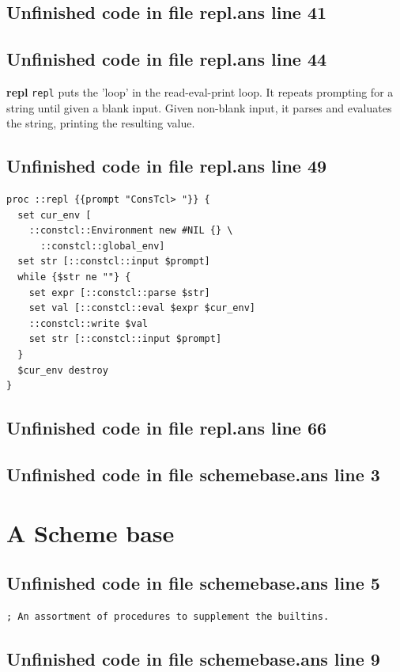 \documentclass[twoside,9pt]{report}
\begin{document}
\section{Unfinished code in file repl.ans line 41}

\section{Unfinished code in file repl.ans line 44}

\textbf{repl} \texttt{repl} puts the 'loop' in the read-eval-print loop. It repeats prompting for a string until given a blank input. Given non-blank input, it parses and evaluates the string, printing the resulting value.

\section{Unfinished code in file repl.ans line 49}
\begin{lstlisting}
proc ::repl {{prompt "ConsTcl> "}} {
  set cur_env [
    ::constcl::Environment new #NIL {} \
      ::constcl::global_env]
  set str [::constcl::input $prompt]
  while {$str ne ""} {
    set expr [::constcl::parse $str]
    set val [::constcl::eval $expr $cur_env]
    ::constcl::write $val
    set str [::constcl::input $prompt]
  }
  $cur_env destroy
}
\end{lstlisting}
\section{Unfinished code in file repl.ans line 66}
\section{Unfinished code in file schemebase.ans line 3}
\chapter{A Scheme base}
\label{a-scheme-base}
\section{Unfinished code in file schemebase.ans line 5}
\begin{lstlisting}
; An assortment of procedures to supplement the builtins.
\end{lstlisting}
\section{Unfinished code in file schemebase.ans line 9}
\end{document}
